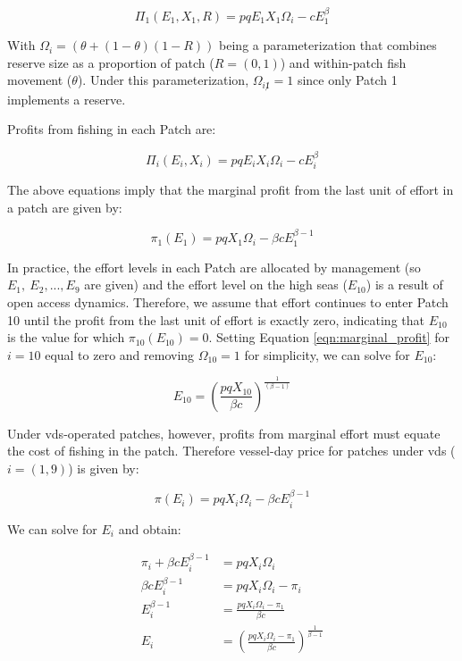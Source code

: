 \documentclass[12pt]{article}
\begin{document}
$$
\Pi_1(E_1,X_1,R) = pqE_1X_1\Omega_i-cE_1^\beta
$$

With $\Omega_i = (\theta + (1 - \theta)(1 - R))$ being a parameterization that combines reserve size as a proportion of patch ($R =  (0, 1)$) and within-patch fish movement ($\theta$). Under this parameterization, $\Omega_{i \not 1} = 1$ since only Patch 1 implements a reserve.

Profits from fishing in each Patch are:

$$
\Pi_i(E_i,X_i) = pqE_iX_i\Omega_i-cE_i^\beta
$$

The above equations imply that the marginal profit from the last unit of effort in a patch are given by:

$$
\pi_1(E_1) = pqX_1\Omega_i - \beta cE_1^{\beta-1}
\label{eqn:marginal_profit}
$$

In practice, the effort levels in each Patch are allocated by management (so $E_{1},\ E_{2},...,E_{9}$ are given) and the
effort level on the high seas ($E_{10}$) is a result of open access dynamics. Therefore, we assume that effort continues to enter Patch 10 until the profit from the last unit of effort is exactly zero, indicating that $E_{10}$ is the value for which $\pi_{10}(E_{10})  = 0$. Setting Equation \ref{eqn:marginal_profit} for $i = 10$ equal to zero and removing $\Omega_{10} = 1$ for simplicity, we can solve for $E_{10}$:

$$
E_{10} = \left(\frac{pqX_{10}}{\beta c}\right)^{\frac{1}{(\beta - 1)}}
\label{eqn:effort_hs}
$$

Under vds-operated patches, however, profits from marginal effort must equate the cost of fishing in the patch. Therefore vessel-day price for patches under vds ($i = (1, 9)$) is  given by:

$$
\pi(E_i) = pqX_i\Omega_i - \beta c E_i ^{\beta - 1}
$$

We can solve for $E_i$ and obtain:

\begin{equation}
	\begin{split}
		\pi_i + \beta c E_i ^{\beta - 1} &= pqX_i\Omega_i \\
		\beta c E_i ^{\beta - 1} &= pqX_i\Omega_i - \pi_i \\
		E_i ^{\beta - 1} &= \frac{pqX_i\Omega_i - \pi_1}{\beta c} \\
		E_i &= \left(\frac{pqX_i\Omega_i - \pi_1}{\beta c }\right) ^ {\frac{1}{\beta - 1}}
	\end{split}
\label{eqn:demands}
\end{equation}
\end{document}
